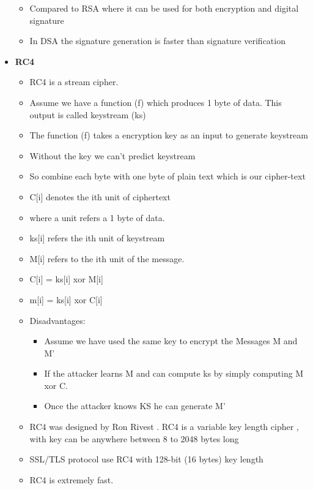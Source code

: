 \documentclass[a4paper]{article}
\begin{document}
\begin{itemize}
\begin{itemize}
            \item Compared to RSA where it can be used for both encryption and digital signature
            \item In DSA the signature generation is faster than signature verification
        \end{itemize}
    \item \textbf{RC4}
        \begin{itemize}
            \item RC4 is a stream cipher.
            \item Assume we have a function (f) which produces 1 byte of data. 
                This output is called keystream (ks)
            \item The function (f) takes a encryption key as an input to generate keystream
            \item Without the key we can't predict keystream
            \item So combine each byte with one byte of plain text which is our cipher-text
            \item C[i] denotes the ith unit of ciphertext 
            \item where a unit refers a 1 byte of data.
            \item ks[i] refers the ith unit of keystream
            \item M[i] refers to the ith unit of the message.
            \item C[i] = ks[i] xor M[i]
            \item m[i] = ks[i] xor C[i] 
            \item Disadvantages:
                \begin{itemize}
                    \item Assume we have used the same key to encrypt the Messages M and M' 
                    \item If the attacker learns M and can compute ks by simply computing M xor C.
                    \item Once the attacker knows KS he can generate M'
                \end{itemize}
            \item RC4 was designed by Ron Rivest . RC4 is a variable key length cipher , with key can be
                anywhere between 8 to 2048 bytes long
            \item SSL/TLS protocol use RC4 with 128-bit (16 bytes) key length
            \item RC4 is extremely fast. 

\end{itemize}
\end{itemize}
\end{document}
